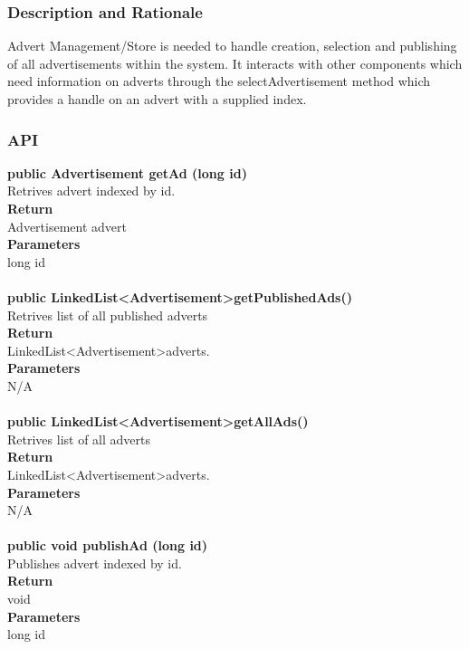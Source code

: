 \documentclass{l3deliverable}
\begin{document}
\subsubsection{Description and Rationale}
Advert Management/Store is needed to handle creation, selection and publishing of all advertisements within the system. It interacts with other components which need information on adverts through the selectAdvertisement method which provides a handle on an advert with a supplied index.
\subsubsection{API}
\textbf{public Advertisement getAd (long id)}\\
Retrives advert indexed by id.\\
\textbf{Return}\\
Advertisement advert\\
\textbf{Parameters}\\
long id\\
\\

\textbf{public LinkedList\textless Advertisement\textgreater   getPublishedAds()}\\
Retrives list of all published adverts\\
\textbf{Return}\\
LinkedList\textless Advertisement\textgreater   adverts.\\
\textbf{Parameters}\\
N/A\\
\\

\textbf{public LinkedList\textless Advertisement\textgreater   getAllAds()}\\
Retrives list of all adverts\\
\textbf{Return}\\
LinkedList\textless Advertisement\textgreater   adverts.\\
\textbf{Parameters}\\
N/A\\
\\

\textbf{public void publishAd (long id)}\\
Publishes advert indexed by id.\\
\textbf{Return}\\
void\\
\textbf{Parameters}\\
long id\\
\\
\end{document}
